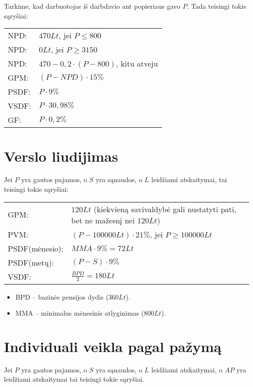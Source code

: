 Tarkime, kad darbuotojas iš darbdavio ant popieriaus gavo $P$. Tada
teisingi tokie sąryšiai:

\begin{tabularx}{15cm}{p{7.5cm}|p{7.5cm}}
  NPD: & $470 Lt$, jei $P \leq 800$ \\
  NPD: & $0 Lt$, jei $P \geq 3150$ \\
  NPD: & $470 - 0,2 \cdot (P - 800)$, kitu atveju \\
  GPM: & $(P - NPD) \cdot 15\%$ \\
  PSDF: & $P \cdot 9\%$ \\
  VSDF: & $P \cdot 30,98\%$ \\
  GF: & $P \cdot 0,2\%$ \\
\end{tabularx}

\section{Verslo liudijimas}

Jei $P$ yra gautos pajamos, o $S$ yra sąnaudos, o $L$ leidžiami
atskaitymai, tai teisingi tokie sąryšiai:

\begin{tabularx}{15cm}{p{7.5cm}|p{7.5cm}}
  GPM: & $120 Lt$ (kiekvieną savivaldybė gali nustatyti pati, bet ne
    mažesnį nei $120 Lt$) \\
  PVM: & $(P - 100 000 Lt) \cdot 21\%$, jei $P \geq 100 000 Lt$ \\
  PSDF(mėnesio): & $MMA \cdot 9\% = 72 Lt$ \\
  PSDF(metų): & $(P - S) \cdot 9\%$ \\
  VSDF: & $\frac{BPD}{2} = 180 Lt$ \\
\end{tabularx}

\begin{itemize}
  \item BPD – bazinės pensijos dydis ($360 Lt$).
  \item MMA – minimalus mėnesinis atlyginimas ($800Lt$).
\end{itemize}

\section{Individuali veikla pagal pažymą}

Jei $P$ yra gautos pajamos, o $S$ yra sąnaudos, o $L$ leidžiami
atskaitymai, o $AP$ yra leidžiami atskaitymai tai teisingi tokie
sąryšiai.

